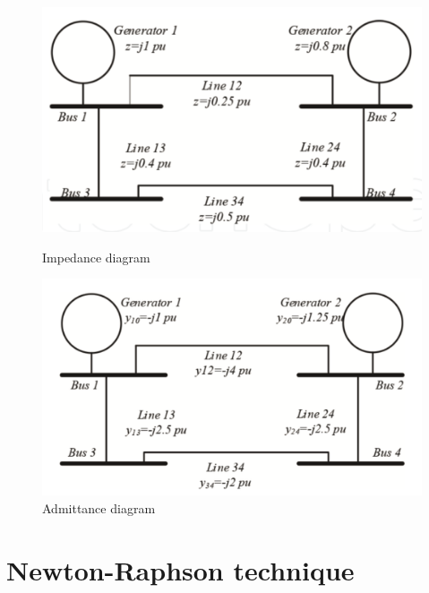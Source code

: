 \documentclass[11pt, oneside, reqno]{amsart}
\numberwithin{equation}{section}
\theoremstyle{plain}%
\theoremstyle{definition}
\theoremstyle{remark}
\begin{document}
\begin{figure}[!ht]
  \centering
  \begin{minipage}[b]{0.5\textwidth}
    \includegraphics[width=\textwidth]{fig2.png}
    \caption[figure 2]{Impedance diagram}
  \end{minipage}
  \hfill
  \begin{minipage}[b]{0.5\textwidth}
    \includegraphics[width=\textwidth]{fig3.png}
    \caption[figure 3]{Admittance diagram}
  \end{minipage}
\end{figure}

\section{Newton-Raphson technique}
\end{document}

